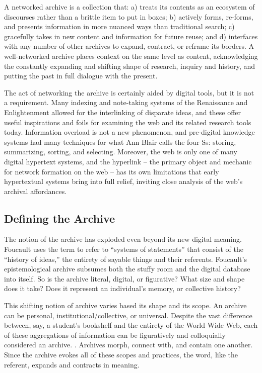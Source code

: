 A networked archive is a collection that: a) treats its contents as an ecosystem of discourses rather than a brittle item to put in boxes; b) actively forms, re-forms, and presents information in more nuanced ways than traditional search; c) gracefully takes in new content and information for future reuse; and d) interfaces with any number of other archives to expand, contract, or reframe its borders. A well-networked archive places context on the same level as content, acknowledging the constantly expanding and shifting shape of research, inquiry and history, and putting the past in full dialogue with the present.

The act of networking the archive is certainly aided by digital tools, but it is not a requirement. Many indexing and note-taking systems of the Renaissance and Enlightenment allowed for the interlinking of disparate ideas, and these offer useful inspirations and foils for examining the web and its related research tools today. Information overload is not a new phenomenon, and pre-digital knowledge systems had many techniques for what Ann Blair calls the four Ss: storing, summarizing, sorting, and selecting.  Moreover, the web is only one of many digital hypertext systems, and the hyperlink – the primary object and mechanic for network formation on the web – has its own limitations that early hypertextual systems bring into full relief, inviting close analysis of the web’s archival affordances.

\subsection{Defining the Archive}

The notion of the archive has exploded even beyond its new digital meaning. Foucault uses the term to refer to “systems of statements” that consist of the “history of ideas,” the entirety of sayable things and their referents.  Foucault’s epistemological archive subsumes both the stuffy room and the digital database into itself. So is the archive literal, digital, or figurative? What size and shape does it take? Does it represent an individual’s memory, or collective history?

This shifting notion of archive varies based its shape and its scope. An archive can be personal, institutional/collective, or universal. Despite the vast difference between, say, a student’s bookshelf and the entirety of the World Wide Web, each of these aggregations of information can be figuratively and colloquially considered an archive. . Archives morph, connect with, and contain one another. Since the archive evokes all of these scopes and practices, the word, like the referent, expands and contracts in meaning.

